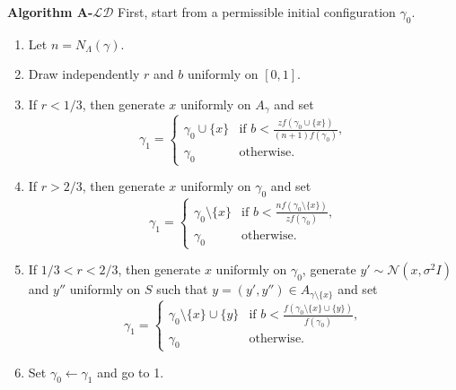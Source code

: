 \noindent \textbf{Algorithm A-$\mathcal{LD}$} \newline
\noindent First, start from a permissible initial configuration $\gamma_0$.
\begin{enumerate}
    \item Let $n = N_\Lambda(\gamma)$.
    \item Draw independently $r$ and $b$ uniformly on $[0,1]$.
    \item If $r<1/3$, then generate $x$ uniformly on $A_\gamma$ and set
        \begin{equation}\label{birth}
        \gamma_1 = 
        \left\{
            \begin{array}{ll}
                \gamma_0 \cup \{x\} & \mbox{if }  b < \frac{z f(\gamma_0 \cup \{x\})}{(n+1)f(\gamma_0)}, \\
                \gamma_0 & \mbox{otherwise. }
            \end{array}
        \right. 
        \end{equation}
    \item If $r>2/3$, then generate $x$ uniformly on $\gamma_0$ and set
        \begin{equation}\label{death}
        \gamma_1 = 
        \left\{
            \begin{array}{ll}
                \gamma_0 \setminus \{x\} & \mbox{if }  b < \frac{n f(\gamma_0 \setminus \{x\})}{zf(\gamma_0)}, \\
                \gamma_0 & \mbox{otherwise. }
            \end{array}
        \right. 
        \end{equation}
    \item If $1/3 < r < 2/3$, then generate $x$ uniformly on $\gamma_0$, generate $y'\sim \mathcal N (x, \sigma^2 I)$ and $y''$ uniformly on $S$ such that $y=(y',y'') \in A_{\gamma \setminus \{x\}}$ and set
        \begin{equation}\label{move}
        \gamma_1 = 
        \left\{
            \begin{array}{ll}
                \gamma_0 \setminus \{x\} \cup \{y\} & \mbox{if }  b < \frac{f(\gamma_0 \setminus \{x\} \cup \{y\})}{f(\gamma_0)}, \\
                \gamma_0 & \mbox{otherwise. }
            \end{array}
        \right. 
        \end{equation}
    \item Set $\gamma_0 \leftarrow \gamma_1$ and go to 1.
\end{enumerate}

